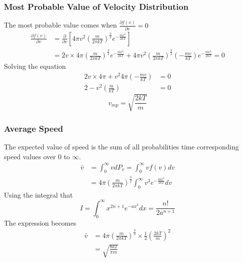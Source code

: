 \documentclass[letterpaper]{article}
\begin{document}
\subsubsection*{Most Probable Value of Velocity Distribution}
The most probable value comes when $\frac{\partial f(v)}{\partial v}=0$
\begin{equation*}
    \begin{aligned}
        \frac{\partial f(v)}{\partial v} & =\frac{\partial}{\partial v}
        [4\pi v^2\left(\frac{m}{2\pi kT}\right)^{\frac{3}{2}}e^{-\frac{mv^2}{2kT}}]     \\
                                         & =2v\times 4\pi\left(\frac{m}{2\pi kT}\right)
        ^{\frac{3}{2}}e^{-\frac{mv^2}{2kT}}+4\pi v^2(\frac{m}{2\pi kT})^{\frac{3}{2}}
        (-\frac{mv}{kT})e^{-\frac{mv^2}{2kT}}
        =0
    \end{aligned}
\end{equation*}
Solving the equation
\begin{equation*}
    \begin{aligned}
        2v\times 4\pi + v^2 4\pi\left(-\frac{mv}{kT}\right) & =0 \\
        2-v^2\left(\frac{m}{kT}\right)                      & =0
    \end{aligned}
\end{equation*}
\begin{equation*}
    v_{mp}=\sqrt{\frac{2kT}{m}}
\end{equation*}
\subsubsection*{Average Speed}
The expected value of speed is the sum of all probabilities time corresponding
speed values over 0 to $\infty$.
\begin{equation*}
    \begin{aligned}
        \bar{v} & =\int_0^\infty vdP_v=\int_0^\infty vf(v)dv                                               \\
                & =4\pi\left(\frac{m}{2\pi kT}\right)^\frac{3}{2}\int_0^\infty v^3 e^{-\frac{mv^2}{2kT}}dv
    \end{aligned}
\end{equation*}
Using the integral that
\begin{equation*}
    I=\int_0^\infty x^{2n+1}e^{-ax^2}dx=\frac{n!}{2a^{n+1}}
\end{equation*}
The expression becomes
\begin{equation*}
    \begin{aligned}
        \bar{v} & =4\pi\left(\frac{m}{2\pi kT}\right)^\frac{3}{2}\times \frac{1}{2}\left(\frac{2kT}{m}\right)^2 \\
                & =\sqrt{\frac{8kT}{\pi m}}
    \end{aligned}
\end{equation*}
\end{document}
